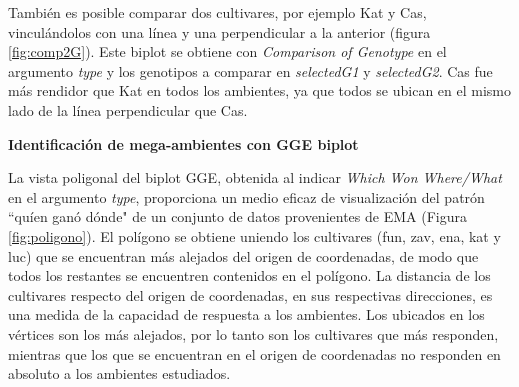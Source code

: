 También es posible comparar dos cultivares, por ejemplo Kat y Cas, vinculándolos con una línea y una perpendicular a la anterior (figura \ref{fig:comp2G}). Este biplot se obtiene con \emph{Comparison of Genotype} en el argumento \emph{type} y los genotipos a comparar en \emph{selectedG1} y \emph{selectedG2}. Cas fue más rendidor que Kat en todos los ambientes, ya que todos se ubican en el mismo lado de la línea perpendicular que Cas. 



\textbf{Identificación de mega-ambientes con GGE biplot}

La vista poligonal del biplot GGE, obtenida al indicar \emph{Which Won Where/What} en el argumento \emph{type}, proporciona un medio eficaz de visualización del patrón ``quíen ganó dónde"  de un conjunto de datos provenientes de EMA (Figura \ref{fig:poligono}).  El polígono se obtiene uniendo los cultivares (fun, zav, ena, kat y luc) que se encuentran más alejados del origen de coordenadas, de modo que todos los restantes se encuentren contenidos en el polígono. La distancia de los cultivares respecto del origen de coordenadas, en sus respectivas direcciones, es una medida de la capacidad de respuesta a los ambientes. Los ubicados en los vértices son los más alejados, por lo tanto son los cultivares que más responden, mientras que los que se encuentran en el origen de coordenadas no responden en absoluto a los ambientes estudiados.

